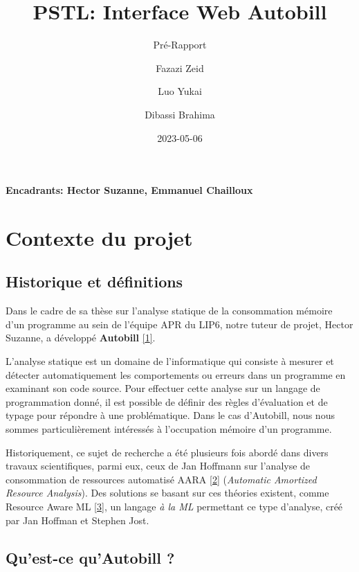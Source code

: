 \documentclass[
  12pt,
]{article}
\title{PSTL: Interface Web Autobill}
\subtitle{Pré-Rapport}
\author{Fazazi Zeid \and Luo Yukai \and Dibassi Brahima}
\date{2023-05-06}
\begin{document}
\maketitle

\textbf{Encadrants: Hector Suzanne, Emmanuel Chailloux} \newpage

{
  \hypersetup{linkcolor=}
  \setcounter{tocdepth}{3}
  \tableofcontents
}
\newpage

\hypertarget{contexte-du-projet}{%
  \section{Contexte du projet}\label{contexte-du-projet}}

\hypertarget{historique-et-duxe9finitions}{%
  \subsection{Historique et
    définitions}\label{historique-et-duxe9finitions}}

Dans le cadre de sa thèse sur l'analyse statique de la consommation
mémoire d'un programme au sein de l'équipe APR du LIP6, notre tuteur de
projet, Hector Suzanne, a développé \textbf{Autobill}
\protect\hyperlink{ref-autobill}{{[}1{]}}.

L'analyse statique est un domaine de l'informatique qui consiste à
mesurer et détecter automatiquement les comportements ou erreurs dans un
programme en examinant son code source. Pour effectuer cette analyse sur
un langage de programmation donné, il est possible de définir des règles
d'évaluation et de typage pour répondre à une problématique. Dans le cas
d'Autobill, nous nous sommes particulièrement intéressés à l'occupation
mémoire d'un programme.

Historiquement, ce sujet de recherche a été plusieurs fois abordé dans
divers travaux scientifiques, parmi eux, ceux de Jan Hoffmann sur
l'analyse de consommation de ressources automatisé AARA
\protect\hyperlink{ref-Hoffmann}{{[}2{]}} (\emph{Automatic Amortized
  Resource Analysis}). Des solutions se basant sur ces théories existent,
comme Resource Aware ML \protect\hyperlink{ref-RAML}{{[}3{]}}, un
langage \emph{à la ML} permettant ce type d'analyse, créé par Jan
Hoffman et Stephen Jost.

\hypertarget{quest-ce-quautobill}{%
  \subsection{Qu'est-ce qu'Autobill ?}\label{quest-ce-quautobill}}
\end{document}
